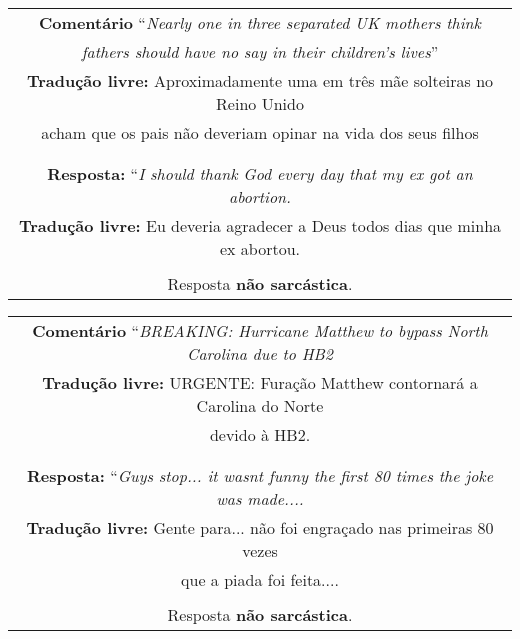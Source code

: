 \begin{center}
\begin{tabular}{|c|}

\hline

\textbf{Comentário} ``\textit{Nearly one in three separated UK mothers think} \\
\textit{fathers should have no say in their children's lives}'' \\

\textbf{Tradução livre:} Aproximadamente uma em três mãe solteiras no Reino Unido\\
acham que os pais não deveriam opinar na vida dos seus filhos \\ \\

\hline

\\

\textbf{Resposta:} ``\textit{I should thank God every day that my ex got an abortion.} \\

\textbf{Tradução livre:} Eu deveria agradecer a Deus todos dias que minha ex abortou. \\ \\

Resposta \textbf{não sarcástica}.

\\ \hline

\end{tabular}
\end{center}

\begin{center}
\begin{tabular}{|c|}

\hline

\textbf{Comentário} ``\textit{BREAKING: Hurricane Matthew to bypass North Carolina due to HB2} \\

\textbf{Tradução livre:} URGENTE: Furação Matthew contornará a Carolina do Norte \\
devido à HB2. \\ \\

\hline

\\

\textbf{Resposta:} ``\textit{Guys stop... it wasnt funny the first 80 times the
joke was made....} \\

\textbf{Tradução livre:} Gente para... não foi engraçado nas primeiras 80 vezes
\\
que a piada foi feita.... \\ \\

Resposta \textbf{não sarcástica}.

\\ \hline

\end{tabular}
\end{center}

